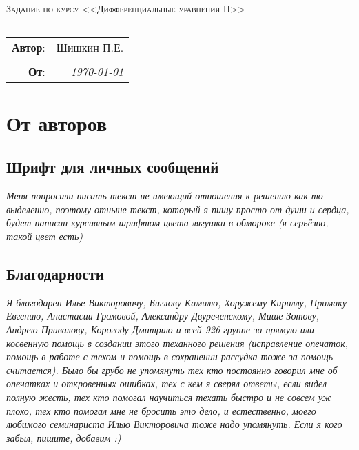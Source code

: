 \documentclass{article}
\begin{document}
\setlength{\abovedisplayskip}{3pt}
\setlength{\abovedisplayshortskip}{3pt}
\setlength{\belowdisplayskip}{3pt}
\setlength{\belowdisplayshortskip}{3pt}


\begin{center}
    \LARGE \textsc{Задание по курсу <<Дифференциальные уравнения II>>}
\end{center}

\hrule

\phantom{42}

\begin{flushright}
    \begin{tabular}{rr}
        \textbf{Автор}: 
        & Шишкин П.Е. \\ 
        &\\
        \textbf{От}: &
        \textit{\today}\\
    \end{tabular}
\end{flushright}

\thispagestyle{empty}
\tableofcontents 
\newpage


\section{От авторов}
\subsection{Шрифт для личных сообщений}
\textcolor[rgb]{0.480469, 0.566406, 0.480469}{\textit{Меня попросили писать текст не имеющий отношения к решению как-то выделенно, поэтому отныне текст, который я пишу просто от души и сердца, будет написан курсивным шрифтом цвета лягушки в обмороке (я серьёзно, такой цвет есть)}}
\subsection{Благодарности}                                            
\textcolor[rgb]{0.480469,0.566406,0.480469}{\textit{Я благодарен Илье Викторовичу, Биглову Камилю, Хоружему Кириллу, Примаку Евгению, Анастасии Громовой, Александру Двуреченскому, Мише Зотову, Андрею Привалову, Корогоду Дмитрию и всей 926 группе за прямую или косвенную помощь в создании этого теханного решения (исправление опечаток, помощь в работе с техом и помощь в сохранении рассудка тоже за помощь считается). Было бы грубо не упомянуть тех кто постоянно говорил мне об опечатках и откровенных ошибках, тех с кем я сверял ответы, если видел полную жесть, тех кто помогал научиться техать быстро и не совсем уж плохо, тех кто помогал мне не бросить это дело, и естественно, моего любимого семинариста Илью Викторовича тоже надо упомянуть. Если я кого забыл, пишите, добавим :)}}
\end{document}
